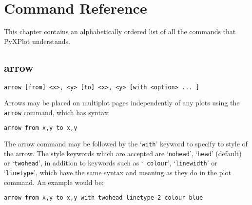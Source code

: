 %
%
%
%
%



\chapter{Command Reference}

This chapter contains an alphabetically ordered list of all the commands that
PyXPlot understands.

\section{arrow}

\begin{verbatim}
arrow [from] <x>, <y> [to] <x>, <y> [with <option> ... ]
\end{verbatim}

Arrows may be placed on multiplot pages independently of any plots using the
{\tt arrow} command, which has syntax:

\begin{verbatim}
arrow from x,y to x,y
\end{verbatim}

The arrow command may be followed by the `{\tt with}' keyword to specify to
style of the arrow. The style keywords which are accepted are `{\tt nohead}',
`{\tt head}' (default) or `{\tt twohead}', in addition to keywords such as `{\tt
colour}', `{\tt linewidth}' or `{\tt linetype}', which have the same syntax and
meaning as they do in the plot command. An example would be:

\begin{verbatim}
arrow from x,y to x,y with twohead linetype 2 colour blue
\end{verbatim}


